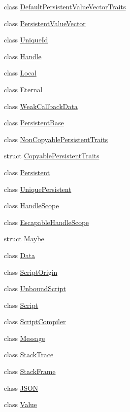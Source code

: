 \begin{DoxyCompactItemize}
class \hyperlink{classv8_1_1DefaultPersistentValueVectorTraits}{Default\-Persistent\-Value\-Vector\-Traits}
\item 
class \hyperlink{classv8_1_1PersistentValueVector}{Persistent\-Value\-Vector}
\item 
class \hyperlink{classv8_1_1UniqueId}{Unique\-Id}
\item 
class \hyperlink{classv8_1_1Handle}{Handle}
\item 
class \hyperlink{classv8_1_1Local}{Local}
\item 
class \hyperlink{classv8_1_1Eternal}{Eternal}
\item 
class \hyperlink{classv8_1_1WeakCallbackData}{Weak\-Callback\-Data}
\item 
class \hyperlink{classv8_1_1PersistentBase}{Persistent\-Base}
\item 
class \hyperlink{classv8_1_1NonCopyablePersistentTraits}{Non\-Copyable\-Persistent\-Traits}
\item 
struct \hyperlink{structv8_1_1CopyablePersistentTraits}{Copyable\-Persistent\-Traits}
\item 
class \hyperlink{classv8_1_1Persistent}{Persistent}
\item 
class \hyperlink{classv8_1_1UniquePersistent}{Unique\-Persistent}
\item 
class \hyperlink{classv8_1_1HandleScope}{Handle\-Scope}
\item 
class \hyperlink{classv8_1_1EscapableHandleScope}{Escapable\-Handle\-Scope}
\item 
struct \hyperlink{structv8_1_1Maybe}{Maybe}
\item 
class \hyperlink{classv8_1_1Data}{Data}
\item 
class \hyperlink{classv8_1_1ScriptOrigin}{Script\-Origin}
\item 
class \hyperlink{classv8_1_1UnboundScript}{Unbound\-Script}
\item 
class \hyperlink{classv8_1_1Script}{Script}
\item 
class \hyperlink{classv8_1_1ScriptCompiler}{Script\-Compiler}
\item 
class \hyperlink{classv8_1_1Message}{Message}
\item 
class \hyperlink{classv8_1_1StackTrace}{Stack\-Trace}
\item 
class \hyperlink{classv8_1_1StackFrame}{Stack\-Frame}
\item 
class \hyperlink{classv8_1_1JSON}{J\-S\-O\-N}
\item 
class \hyperlink{classv8_1_1Value}{Value}

\end{DoxyCompactItemize}
